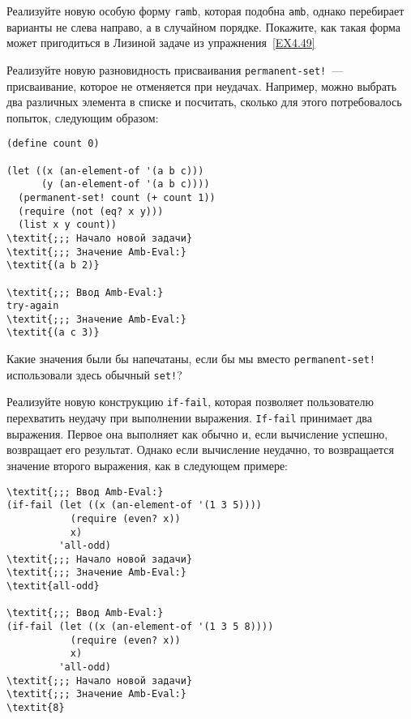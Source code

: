 \begin{exercise}{4.50}%
\label{EX4.50}%
Реализуйте новую особую форму {\tt ramb},
которая подобна {\tt amb}, однако перебирает варианты не
слева направо, а в случайном порядке.  Покажите, как такая форма может
пригодиться в Лизиной задаче из упражнения~\ref{EX4.49}
\end{exercise}

\begin{exercise}{4.51}%
\label{EX4.51}%
Реализуйте новую разновидность присваивания
{\tt permanent-set!}~--- присваивание, которое не отменяется
при неудачах.  Например, можно выбрать два различных элемента в списке
и посчитать, сколько для этого потребовалось попыток, следующим
образом:

\begin{Verbatim}[fontsize=\small]
(define count 0)

(let ((x (an-element-of '(a b c)))
      (y (an-element-of '(a b c))))
  (permanent-set! count (+ count 1))
  (require (not (eq? x y)))
  (list x y count))
\textit{;;; Начало новой задачи}
\textit{;;; Значение Amb-Eval:}
\textit{(a b 2)}

\textit{;;; Ввод Amb-Eval:}
try-again
\textit{;;; Значение Amb-Eval:}
\textit{(a c 3)}
\end{Verbatim}
Какие значения были бы напечатаны, если бы мы вместо
{\tt permanent-set!} использовали здесь обычный {\tt set!}?
\end{exercise}

\begin{exercise}{4.52}%
\label{EX4.52}%
Реализуйте новую конструкцию {\tt if-fail},
которая позволяет пользователю перехватить неудачу при выполнении
выражения. {\tt If-fail} принимает два выражения.  Первое она
выполняет как обычно и, если вычисление успешно, возвращает его
результат.  Однако если вычисление неудачно, то возвращается значение
второго выражения, как в следующем примере:

\begin{Verbatim}[fontsize=\small]
\textit{;;; Ввод Amb-Eval:}
(if-fail (let ((x (an-element-of '(1 3 5))))
           (require (even? x))
           x)
         'all-odd)
\textit{;;; Начало новой задачи}
\textit{;;; Значение Amb-Eval:}
\textit{all-odd}

\textit{;;; Ввод Amb-Eval:}
(if-fail (let ((x (an-element-of '(1 3 5 8))))
           (require (even? x))
           x)
         'all-odd)
\textit{;;; Начало новой задачи}
\textit{;;; Значение Amb-Eval:}
\textit{8}
\end{Verbatim}
\end{exercise}

